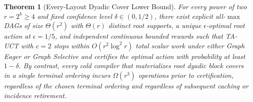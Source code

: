\documentclass{article}
\theoremstyle{plain}
\newtheorem{theorem}{Theorem}[section]
\theoremstyle{definition}
\begin{document}
\begin{theorem}[Every-Layout Dyadic Cover Lower Bound]
\label{thm:coded-covers}
For every power of two $r = 2^k \ge 4$ and fixed confidence level $\delta \in (0, 1/2)$, there exist explicit all-$\max$ DAGs of size $\Theta(r^2)$ with $\Theta(r)$ distinct root supports, a unique $\epsilon$-optimal root action at $\epsilon = 1/5$, and independent continuous bounded rewards such that TA-UCT with $c = 2$ stops within $O(r^2 \log^2 r)$ total scalar work under either \emph{Graph Eager} or \emph{Graph Selective} and certifies the optimal action with probability at least $1 - \delta$. By contrast, every cold compiler that materializes root dyadic block covers in a single terminal ordering incurs $\Omega(r^3)$ operations prior to certification, regardless of the chosen terminal ordering and regardless of subsequent caching or incidence retirement.
\end{theorem}
\end{document}
